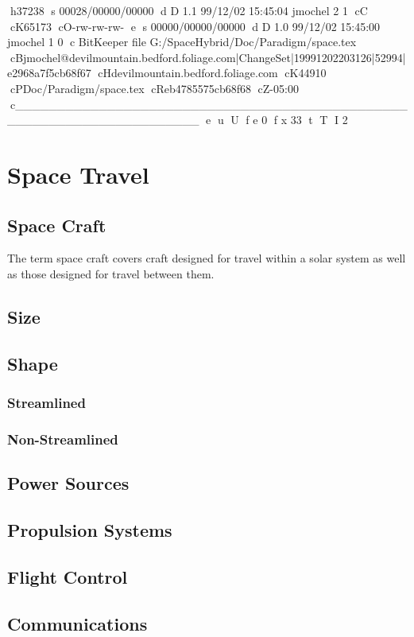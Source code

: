 h37238
s 00028/00000/00000
d D 1.1 99/12/02 15:45:04 jmochel 2 1
cC
cK65173
cO-rw-rw-rw-
e
s 00000/00000/00000
d D 1.0 99/12/02 15:45:00 jmochel 1 0
c BitKeeper file G:/SpaceHybrid/Doc/Paradigm/space.tex
cBjmochel@devilmountain.bedford.foliage.com|ChangeSet|19991202203126|52994|e2968a7f5cb68f67
cHdevilmountain.bedford.foliage.com
cK44910
cPDoc/Paradigm/space.tex
cReb4785575cb68f68
cZ-05:00
c______________________________________________________________________
e
u
U
f e 0
f x 33
t
T
I 2
\chapter{Space Travel}

\section{Space Craft}

The term space craft covers craft designed for travel within a solar 
system as well as those designed for travel between them.

\section{Size}
\section{Shape}
\subsection{Streamlined}
\subsection{Non-Streamlined}
\section{Power Sources}
\section{Propulsion Systems}
\section{Flight Control}
\section{Communications}
